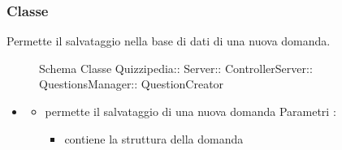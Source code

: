 \subsubsection{Classe }
Permette il salvataggio nella base di dati di una nuova domanda.
\begin{figure}[H]
\centering
\noindent{}
\caption[Schema Classe QuestionCreator]{Schema Classe Quizzipedia:: Server:: ControllerServer:: QuestionsManager:: QuestionCreator}
\end{figure}
\begin{itemize}
\item {}
\begin{itemize}
\item {}
\newline
permette il salvataggio di una nuova domanda
\newline
Parametri :
\begin{itemize}
\item {}
\newline
contiene la struttura della domanda
\end{itemize}
\end{itemize}
\end{itemize}
